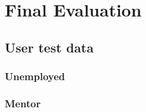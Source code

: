 
\chapter{Final Evaluation}

\section{User test data} 

\subsection{Unemployed}

\subsection{Mentor}

\cleardoublepage